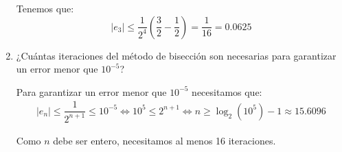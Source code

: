 \begin{ejercicio}
\begin{enumerate}
        Tenemos que:
        \begin{equation*}
            |e_3| \leq \dfrac{1}{2^{4}}\left(\dfrac{3}{2}-\dfrac{1}{2}\right)=\dfrac{1}{16}=0.0625
        \end{equation*}
        \item ¿Cuántas iteraciones del método de bisección son necesarias para garantizar un error menor que $10^{-5}$?
        
        Para garantizar un error menor que $10^{-5}$ necesitamos que:
        \begin{align*}
            |e_n| \leq \dfrac{1}{2^{n+1}}\leq 10^{-5} \iff 10^5\leq 2^{n+1}\iff n\geq \log_2(10^5)-1\approx 15.6096
        \end{align*}

        Como $n$ debe ser entero, necesitamos al menos 16 iteraciones.
    \end{enumerate}
\end{ejercicio}

